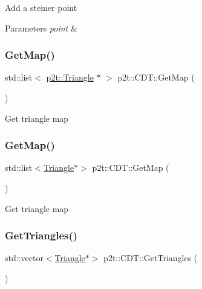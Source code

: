 Add a steiner point


\begin{DoxyParams}{Parameters}
{\em point} & \\
\hline
\end{DoxyParams}
\mbox{\label{classp2t_1_1CDT_a4491cea3f797ec485f34dd3c7d62050f}} 
\subsubsection{\texorpdfstring{Get\+Map()}{GetMap()}\hspace{0.1cm}{\footnotesize\ttfamily [1/2]}}
{\footnotesize\ttfamily std\+::list$<$ \hyperlink{classp2t_1_1Triangle}{p2t\+::\+Triangle} $\ast$ $>$ p2t\+::\+C\+D\+T\+::\+Get\+Map (\begin{DoxyParamCaption}{ }\end{DoxyParamCaption})}

Get triangle map \mbox{\label{classp2t_1_1CDT_a21d26326ba731670dc48ac1897e6f181}} 
\subsubsection{\texorpdfstring{Get\+Map()}{GetMap()}\hspace{0.1cm}{\footnotesize\ttfamily [2/2]}}
{\footnotesize\ttfamily std\+::list$<$\hyperlink{classp2t_1_1Triangle}{Triangle}$\ast$$>$ p2t\+::\+C\+D\+T\+::\+Get\+Map (\begin{DoxyParamCaption}{ }\end{DoxyParamCaption})}

Get triangle map \mbox{\label{classp2t_1_1CDT_a7b1cf94ed4277a0dfc901cba7b46a0e2}} 
\subsubsection{\texorpdfstring{Get\+Triangles()}{GetTriangles()}\hspace{0.1cm}{\footnotesize\ttfamily [1/2]}}
{\footnotesize\ttfamily std\+::vector$<$\hyperlink{classp2t_1_1Triangle}{Triangle}$\ast$$>$ p2t\+::\+C\+D\+T\+::\+Get\+Triangles (\begin{DoxyParamCaption}{ }\end{DoxyParamCaption})}

